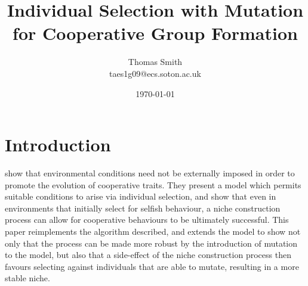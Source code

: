 \documentclass[11pt]{article}
\begin{document}
\title      {\vspace{-2cm}\textbf{Individual Selection with Mutation for Cooperative Group Formation}}
\author	    {Thomas Smith\\taes1g09@ecs.soton.ac.uk}
\date       {\today}
\maketitle
\section{Introduction}

\citet*{orig} show that environmental conditions need not be externally imposed in order to promote the evolution of cooperative traits. They present a model which permits suitable conditions to arise via individual selection, and show that even in environments that initially select for selfish behaviour, a niche construction process can allow for cooperative behaviours to be ultimately successful. This paper reimplements the algorithm described, and extends the model to show not only that the process can be made more robust by the introduction of mutation to the model, but also that a side-effect of the niche construction process then favours selecting against individuals that are able to mutate, resulting in a more stable niche.
\end{document}

